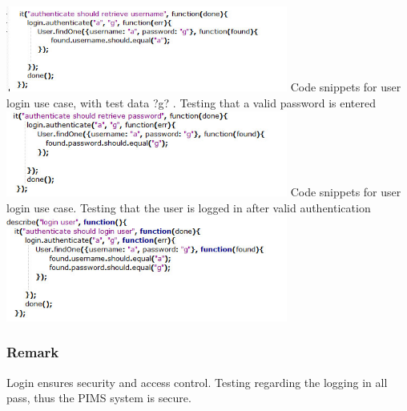\includegraphics[width=350px]{./Graphics/usernameTest}
\newline 
\newline 
Code snippets for user login use case, with test data ?g?  . Testing that a valid password is entered
\newline 
\newline
\includegraphics[width=350px]{./Graphics/passwordTest}
\newline 
\newline
Code snippets for user login use case. Testing that the user is logged in after valid authentication
\newline 
\newline
\includegraphics[width=350px]{./Graphics/UserMustLogIn}

\subsubsection*{Remark}
Login ensures security and access control. Testing regarding the logging in all pass, thus the PIMS system is secure.